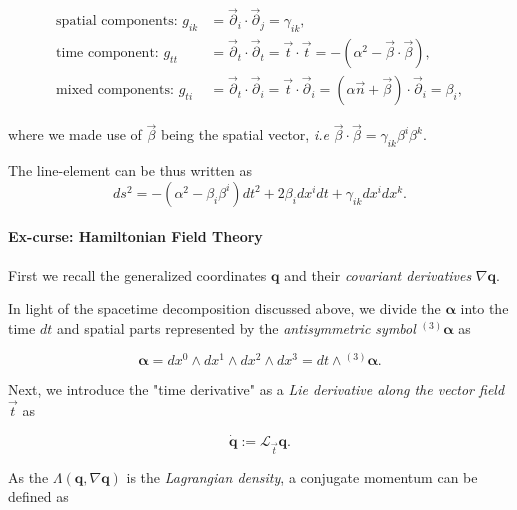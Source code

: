 {    \begin{align}
        \text{spatial components: } g_{ik}&=\vec{\partial}_{i}\cdot\vec{\partial}_{j} =\gamma_{ik}, \\
        \text{time component: } g_{tt} &= \vec{\partial}_{t}\cdot\vec{\partial}_{t} = \vec{t}\cdot\vec{t} = - (\alpha^2-\vec{\beta}\cdot\vec{\beta}), \\
        \text{mixed components: } g_{ti} &= \vec{\partial}_{t}\cdot\vec{\partial}_{i} = \vec{t}\cdot\vec{\partial}_i = (\alpha\vec{n}+\vec{\beta})\cdot\vec{\partial}_i=\beta_i,
    \end{align}
    
    where we made use of $\vec{\beta}$ being the spatial vector, \textit{i.e} $\vec{\beta}\cdot\vec{\beta}=\gamma_{ik}\beta^i\beta^k$.
    
    The line-element can be thus written as
    \begin{equation}
        ds^2 = -(\alpha^2-\beta_i\beta^i)dt^2 +2\beta_i dx^i dt + \gamma_{ik} dx^i dx^k.
    \end{equation}
    
    
    \paragraph{Ex-curse: Hamiltonian Field Theory}
    
    
    First we recall the generalized coordinates $\boldsymbol{q}$ and their \textit{covariant derivatives} $\nabla\boldsymbol{q}$. 
    
    In light of the spacetime decomposition discussed above, we divide the $\boldsymbol{\alpha}$ into the time $dt$ and spatial parts represented by the \textit{antisymmetric symbol} ${^{(3)}\boldsymbol{\alpha}}$ as 
    
    \begin{equation}
        \boldsymbol{\alpha} = dx^0 \wedge dx^1 \wedge dx^2 \wedge dx^3 = dt \wedge {^{(3)}\boldsymbol{\alpha}}.
    \end{equation}
    
    Next, we introduce the "time derivative" as a \textit{Lie derivative along the vector field} $\vec{t}$ as 
    
    \begin{equation}
        \dot{\boldsymbol{q}} := \mathcal{L}_{\vec{t}}\boldsymbol{q}.
    \end{equation}
    
    As the $\Lambda(\boldsymbol{q}, \nabla\boldsymbol{q})$ is the \textit{Lagrangian density}, a conjugate momentum can be defined as 
    
}
